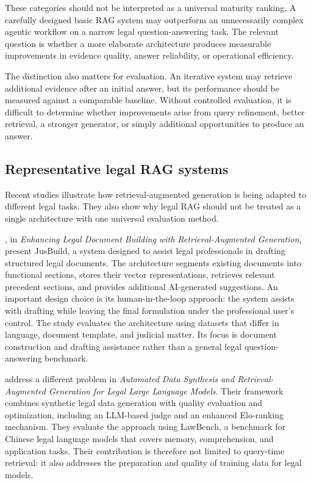 These categories should not be interpreted as a universal maturity ranking. A carefully designed
basic RAG system may outperform an unnecessarily complex agentic workflow on a narrow legal
question-answering task. The relevant question is whether a more elaborate architecture produces
measurable improvements in evidence quality, answer reliability, or operational efficiency.

The distinction also matters for evaluation. An iterative system may retrieve additional evidence
after an initial answer, but its performance should be measured against a comparable baseline.
Without controlled evaluation, it is difficult to determine whether improvements arise from query
refinement, better retrieval, a stronger generator, or simply additional opportunities to produce an
answer.

\subsection{Representative legal RAG systems}

Recent studies illustrate how retrieval-augmented generation is being adapted to different legal
tasks. They also show why legal RAG should not be treated as a single architecture with one universal
evaluation method.

\citet{buffa2025}, in \emph{Enhancing Legal Document Building with Retrieval-Augmented Generation},
present JusBuild, a system designed to assist legal professionals in drafting structured legal
documents. The architecture segments existing documents into functional sections, stores their
vector representations, retrieves relevant precedent sections, and provides additional AI-generated
suggestions. An important design choice is its human-in-the-loop approach: the system assists with
drafting while leaving the final formulation under the professional user's control. The study
evaluates the architecture using datasets that differ in language, document template, and judicial
matter. Its focus is document construction and drafting assistance rather than a general legal
question-answering benchmark.

\citet{ren2026} address a different problem in \emph{Automated Data Synthesis and Retrieval-Augmented
Generation for Legal Large Language Models}. Their framework combines synthetic legal data generation
with quality evaluation and optimization, including an LLM-based judge and an enhanced Elo-ranking
mechanism. They evaluate the approach using LawBench, a benchmark for Chinese legal language models
that covers memory, comprehension, and application tasks. Their contribution is therefore not limited
to query-time retrieval: it also addresses the preparation and quality of training data for legal
models.

